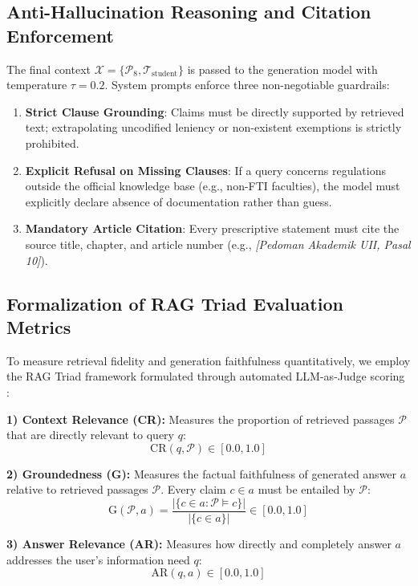 \documentclass[conference]{IEEEtran}
\begin{document}
\subsection{Anti-Hallucination Reasoning and Citation Enforcement}
The final context $\mathcal{X} = \{\mathcal{P}_8, \mathcal{T}_{\text{student}}\}$ is passed to the generation model with temperature $\tau = 0.2$. System prompts enforce three non-negotiable guardrails:
\begin{enumerate}
    \item \textbf{Strict Clause Grounding}: Claims must be directly supported by retrieved text; extrapolating uncodified leniency or non-existent exemptions is strictly prohibited.
    \item \textbf{Explicit Refusal on Missing Clauses}: If a query concerns regulations outside the official knowledge base (e.g., non-FTI faculties), the model must explicitly declare absence of documentation rather than guess.
    \item \textbf{Mandatory Article Citation}: Every prescriptive statement must cite the source title, chapter, and article number (e.g., \textit{[Pedoman Akademik UII, Pasal 10]}).
\end{enumerate}

\subsection{Formalization of RAG Triad Evaluation Metrics}
To measure retrieval fidelity and generation faithfulness quantitatively, we employ the RAG Triad framework formulated through automated LLM-as-Judge scoring \cite{es2023ragas, saad2023trulens}:

\textbf{1) Context Relevance (CR):} Measures the proportion of retrieved passages $\mathcal{P}$ that are directly relevant to query $q$:
\begin{equation}
\text{CR}(q, \mathcal{P}) \in [0.0, 1.0]
\end{equation}

\textbf{2) Groundedness (G):} Measures the factual faithfulness of generated answer $a$ relative to retrieved passages $\mathcal{P}$. Every claim $c \in a$ must be entailed by $\mathcal{P}$:
\begin{equation}
\text{G}(\mathcal{P}, a) = \frac{|\{c \in a : \mathcal{P} \models c\}|}{|\{c \in a\}|} \in [0.0, 1.0]
\end{equation}

\textbf{3) Answer Relevance (AR):} Measures how directly and completely answer $a$ addresses the user's information need $q$:
\begin{equation}
\text{AR}(q, a) \in [0.0, 1.0]
\end{equation}
\end{document}
